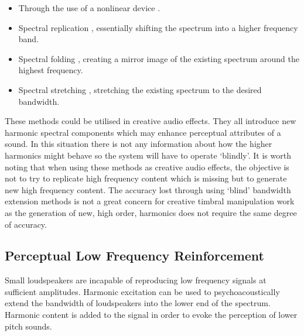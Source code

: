 		\begin{itemize}
			\item Through the use of a nonlinear device \citep{larsen2002efficient, sha2010high}.
			\item Spectral replication \citep{nagel2010a}, essentially shifting the spectrum into a higher
			      frequency band.
			\item Spectral folding \citep{friedrich2007spectral}, creating a mirror image of the existing
			      spectrum around the highest frequency.
			\item Spectral stretching \citep{nagel2009a}, stretching the existing spectrum to the desired
			      bandwidth.
		\end{itemize}

		These methods could be utilised in creative audio effects. They all introduce new harmonic spectral
		components which may enhance perceptual attributes of a sound. In this situation there is not any
		information about how the higher harmonics might behave so the system will have to operate `blindly'. It is
		worth noting that when using these methods as creative audio effects, the objective is not to try to
		replicate high frequency content which is missing but to generate new high frequency content. The accuracy
		lost through using `blind' bandwidth extension methods is not a great concern for creative timbral
		manipulation work as the generation of new, high order, harmonics does not require the same degree of
		accuracy.

	\subsection{Perceptual Low Frequency Reinforcement}
	\label{sec:Excitation-Uses-Reinforcement}
		Small loudspeakers are incapable of reproducing low frequency signals at sufficient amplitudes. Harmonic
		excitation can be used to psychoacoustically extend the bandwidth of loudspeakers into the lower end of the
		spectrum. Harmonic content is added to the signal in order to evoke the perception of lower pitch sounds.
		
